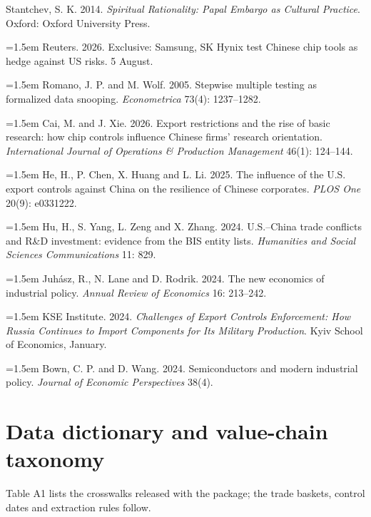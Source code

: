\documentclass[12pt]{article}
\begin{document}
  Stantchev, S. K. 2014. \emph{Spiritual Rationality: Papal Embargo as Cultural Practice}. Oxford: Oxford University Press.
\par\noindent\hangindent=1.5em 
  Reuters. 2026. Exclusive: Samsung, SK Hynix test Chinese chip tools as hedge against US risks. 5 August.
\par\noindent\hangindent=1.5em 
  Romano, J. P. and M. Wolf. 2005. Stepwise multiple testing as formalized data snooping. \emph{Econometrica} 73(4): 1237--1282.
\par\noindent\hangindent=1.5em 
  Cai, M. and J. Xie. 2026. Export restrictions and the rise of basic research: how chip controls influence Chinese firms' research orientation. \emph{International Journal of Operations \& Production Management} 46(1): 124--144.
\par\noindent\hangindent=1.5em 
  He, H., P. Chen, X. Huang and L. Li. 2025. The influence of the U.S. export controls against China on the resilience of Chinese corporates. \emph{PLOS One} 20(9): e0331222.
\par\noindent\hangindent=1.5em 
  Hu, H., S. Yang, L. Zeng and X. Zhang. 2024. U.S.--China trade conflicts and R\&D investment: evidence from the BIS entity lists. \emph{Humanities and Social Sciences Communications} 11: 829.
\par\noindent\hangindent=1.5em 
  Juhász, R., N. Lane and D. Rodrik. 2024. The new economics of industrial policy. \emph{Annual Review of Economics} 16: 213--242.
\par\noindent\hangindent=1.5em 
  KSE Institute. 2024. \emph{Challenges of Export Controls Enforcement: How Russia Continues to Import Components for Its Military Production}. Kyiv School of Economics, January.
\par\noindent\hangindent=1.5em 
  Bown, C. P. and D. Wang. 2024. Semiconductors and modern industrial policy. \emph{Journal of Economic Perspectives} 38(4).


\endgroup
\appendix{}\setcounter{figure}{0}\setcounter{table}{0}
\clearpage\section{Data dictionary and value-chain taxonomy}
\noindent Table A1 lists the crosswalks released with the package; the trade baskets, control dates and extraction rules follow.
\end{document}

